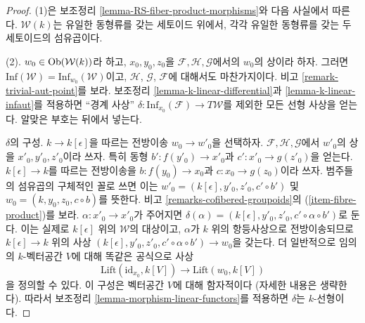 \begin{proof}
(1)은 보조정리 \ref{lemma-RS-fiber-product-morphisms}와 다음 사실에서
따른다. $\mathcal{W}(k)$는 유일한 동형류를 갖는 세토이드 위에서,
각각 유일한 동형류를 갖는 두 세토이드의 섬유곱이다.

\medskip\noindent
(2). $w_0 \in \mathop{\mathrm{Ob}}\nolimits(\mathcal{W}(k))$라 하고, $x_0, y_0, z_0$을
$\mathcal{F}, \mathcal{H}, \mathcal{G}$에서의 $w_0$의 상이라 하자.
그러면 $\text{Inf}(\mathcal{W}) = \text{Inf}_{w_0}(\mathcal{W})$이고,
$\mathcal{H}$, $\mathcal{G}$, $\mathcal{F}$에 대해서도 마찬가지이다.
비고 \ref{remark-trivial-aut-point}를 보라.
보조정리 \ref{lemma-k-linear-differential}과
\ref{lemma-k-linear-infaut}를 적용하면 ``경계 사상''
$\delta : \text{Inf}_{x_0}(\mathcal{F}) \to T\mathcal{W}$를 제외한
모든 선형 사상을 얻는다. 알맞은 부호는 뒤에서 넣는다.

\medskip\noindent
$\delta$의 구성. $k \to k[\epsilon]$을 따르는 전방이송
$w_0 \to w'_0$을 선택하자. $\mathcal{F}, \mathcal{H}, \mathcal{G}$에서
$w'_0$의 상을 $x'_0, y'_0, z'_0$이라 쓰자. 특히 동형
$b' : f(y'_0) \to x'_0$과 $c' : x'_0 \to g(z'_0)$을 얻는다.
$k[\epsilon] \to k$를 따르는 전방이송을
$b : f(y_0) \to x_0$과 $c : x_0 \to g(z_0)$이라 쓰자.
범주들의 섬유곱의 구체적인 꼴로 쓰면 이는
$w'_0 = (k[\epsilon], y'_0, z'_0, c' \circ b')$ 및
$w_0 = (k, y_0, z_0, c \circ b)$를 뜻한다. 비고
\ref{remarks-cofibered-groupoids}의 (\ref{item-fibre-product})를 보라.
$\alpha : x'_0 \to x'_0$가 주어지면
$\delta(\alpha) = (k[\epsilon], y'_0, z'_0, c' \circ \alpha \circ b')$로
둔다. 이는 실제로 $k[\epsilon]$ 위의 $\mathcal{W}$의 대상이고,
$\alpha$가 $k$ 위의 항등사상으로 전방이송되므로
$k[\epsilon] \to k$ 위의 사상
$(k[\epsilon], y'_0, z'_0, c' \circ \alpha \circ b') \to w_0$을 갖는다.
더 일반적으로 임의의 $k$-벡터공간 $V$에 대해 똑같은 공식으로 사상
$$
\text{Lift}(\text{id}_{x_0}, k[V])
\longrightarrow
\text{Lift}(w_0, k[V])
$$
을 정의할 수 있다. 이 구성은 벡터공간 $V$에 대해 함자적이다
(자세한 내용은 생략한다). 따라서 보조정리
\ref{lemma-morphism-linear-functors}를 적용하면 $\delta$는 $k$-선형이다.


\end{proof}
